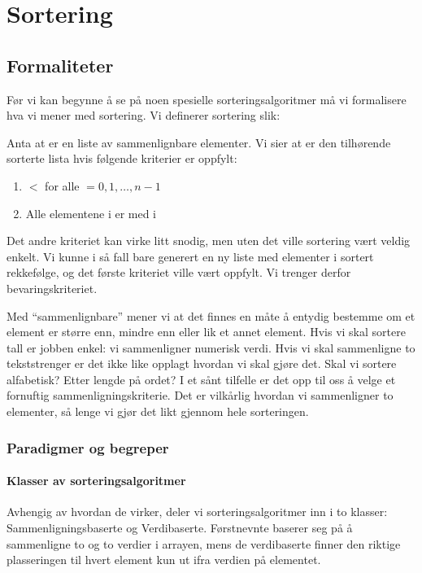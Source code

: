 \section{Sortering}
\subsection{Formaliteter}
\label{sort_form}
Før vi kan begynne å se på noen spesielle sorteringsalgoritmer må vi formalisere hva vi mener med sortering. Vi definerer sortering slik:

\begin{definition}
Anta at  er en liste av sammenlignbare elementer. Vi sier at  er den tilhørende sorterte lista hvis følgende kriterier er oppfylt:
\begin{enumerate}[i]
\item {} $ < $  for alle  $ = 0, 1, \ldots, n-1 $
\item Alle elementene i  er med i 
\end{enumerate}
\end{definition}

Det andre kriteriet kan virke litt snodig, men uten det ville sortering vært veldig enkelt. Vi kunne i så fall bare generert en ny liste med elementer i sortert rekkefølge, og det første kriteriet ville vært oppfylt. Vi trenger derfor bevaringskriteriet. 

Med ``sammenlignbare'' mener vi at det finnes en måte å entydig bestemme om et element er større enn, mindre enn eller lik et annet element. Hvis vi skal sortere tall er jobben enkel: vi sammenligner numerisk verdi. Hvis vi skal sammenligne to tekststrenger er det ikke like opplagt hvordan vi skal gjøre det. Skal vi sortere alfabetisk? Etter lengde på ordet? I et sånt tilfelle er det opp til oss å velge et fornuftig sammenligningskriterie. Det er vilkårlig hvordan vi sammenligner to elementer, så lenge vi gjør det likt gjennom hele sorteringen. 

\subsubsection{Paradigmer og begreper}
\label{sec:sortbegrep}

\paragraph{Klasser av sorteringsalgoritmer}
Avhengig av hvordan de virker, deler vi sorteringsalgoritmer inn i to klasser:
Sammenligningsbaserte og Verdibaserte. Førstnevnte baserer seg på å sammenligne
to og to verdier i arrayen, mens de verdibaserte finner den riktige plasseringen
til hvert element kun ut ifra verdien på elementet. 


